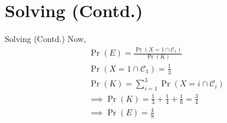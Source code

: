 \documentclass{beamer}
\providecommand{\pr}[1]{\ensuremath{\Pr\left(#1\right)}}
\begin{document}
\section{Solving (Contd.)}
\begin{frame}{Solving (Contd.)}
Now,
\begin{align}
   & \pr{E} = \frac{\pr{X = 1 \cap \mathcal{C}_1}}{\pr{K}} \\
    &\pr{X = 1 \cap \mathcal{C}_1} = \frac{1}{3} \\
    &\pr{K} = \sum_{i = 1}^{3}{\pr{X = i \cap \mathcal{C}_i}} \\
    &\implies \pr{K} = \frac{1}{3} + \frac{1}{4} + \frac{1}{6} = \frac{3}{4} \\
    &\implies \pr{E} = \frac{4}{9}
\end{align}
\end{frame}
\end{document}
